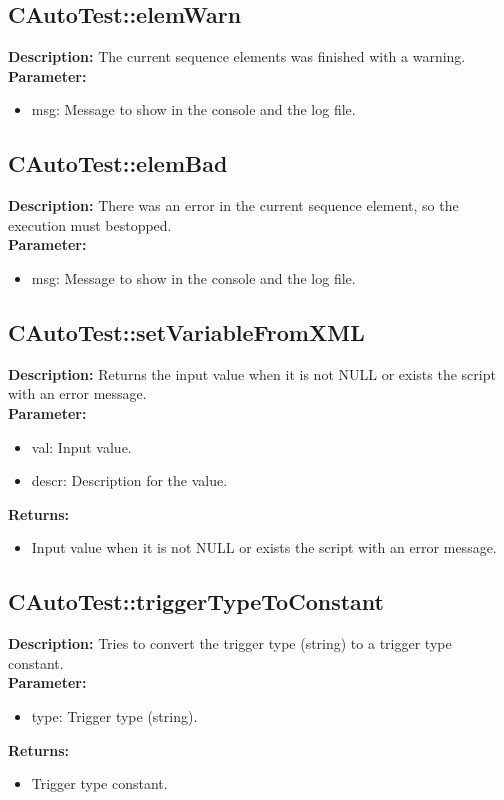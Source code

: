 \subsection{CAutoTest::elemWarn}
\textbf{Description:} The current sequence elements was finished with a warning.\\
\textbf{Parameter:}
\begin{itemize}
\item msg: Message to show in the console and the log file.
\end{itemize}

\subsection{CAutoTest::elemBad}
\textbf{Description:} There was an error in the current sequence element, so the execution must bestopped.\\
\textbf{Parameter:}
\begin{itemize}
\item msg: Message to show in the console and the log file.
\end{itemize}

\subsection{CAutoTest::setVariableFromXML}
\textbf{Description:} Returns the input value when it is not NULL or exists the script with an error message.\\
\textbf{Parameter:}
\begin{itemize}
\item val: Input value.
\item descr: Description for the value.
\end{itemize}
\textbf{Returns:}
\begin{itemize}
\item Input value when it is not NULL or exists the script with an error message.
\end{itemize}

\subsection{CAutoTest::triggerTypeToConstant}
\textbf{Description:} Tries to convert the trigger type (string) to a trigger type constant.\\
\textbf{Parameter:}
\begin{itemize}
\item type: Trigger type (string).
\end{itemize}
\textbf{Returns:}
\begin{itemize}
\item Trigger type constant.
\end{itemize}

